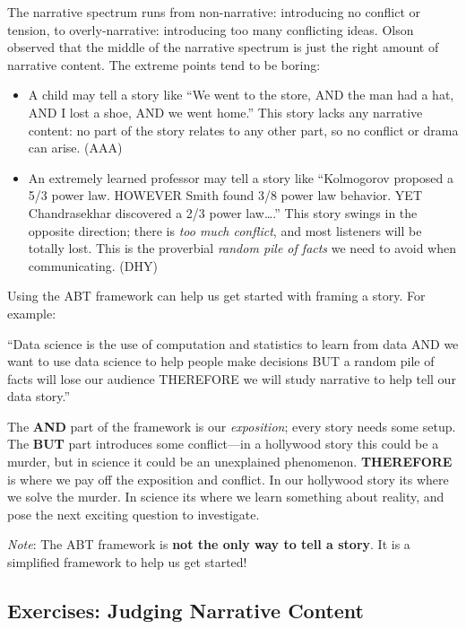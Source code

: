 \documentclass[
]{article}
\providecommand{\tightlist}{%
  \setlength{\itemsep}{0pt}\setlength{\parskip}{0pt}}
\begin{document}
The narrative spectrum runs from non-narrative: introducing no conflict
or tension, to overly-narrative: introducing too many conflicting ideas.
Olson observed that the middle of the narrative spectrum is just the
right amount of narrative content. The extreme points tend to be boring:

\begin{itemize}
\tightlist
\item
  A child may tell a story like ``We went to the store, AND the man had
  a hat, AND I lost a shoe, AND we went home.'' This story lacks any
  narrative content: no part of the story relates to any other part, so
  no conflict or drama can arise. (AAA)
\item
  An extremely learned professor may tell a story like ``Kolmogorov
  proposed a 5/3 power law. HOWEVER Smith found 3/8 power law behavior.
  YET Chandrasekhar discovered a 2/3 power law\ldots.'' This story
  swings in the opposite direction; there is \emph{too much conflict},
  and most listeners will be totally lost. This is the proverbial
  \emph{random pile of facts} we need to avoid when communicating. (DHY)
\end{itemize}

Using the ABT framework can help us get started with framing a story.
For example:

``Data science is the use of computation and statistics to learn from
data AND we want to use data science to help people make decisions BUT a
random pile of facts will lose our audience THEREFORE we will study
narrative to help tell our data story.''

The \textbf{AND} part of the framework is our \emph{exposition}; every
story needs some setup. The \textbf{BUT} part introduces some
conflict---in a hollywood story this could be a murder, but in science
it could be an unexplained phenomenon. \textbf{THEREFORE} is where we
pay off the exposition and conflict. In our hollywood story its where we
solve the murder. In science its where we learn something about reality,
and pose the next exciting question to investigate.

\emph{Note}: The ABT framework is \textbf{not the only way to tell a
story}. It is a simplified framework to help us get started!

\hypertarget{exercises-judging-narrative-content}{%
\subsection{Exercises: Judging Narrative
Content}\label{exercises-judging-narrative-content}}
\end{document}
